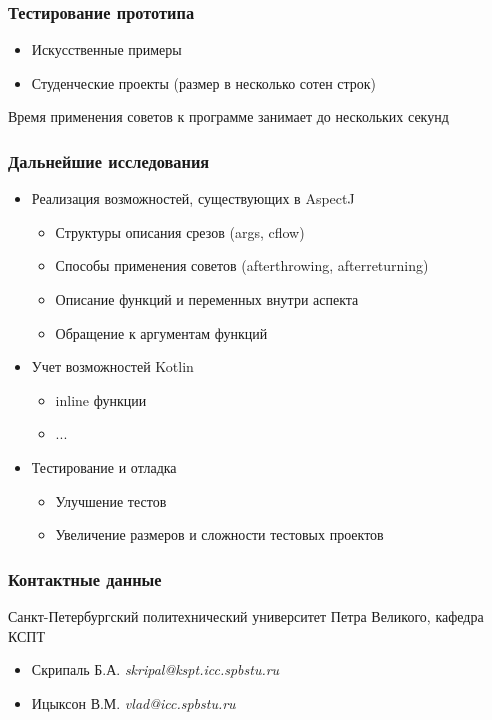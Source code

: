 \documentclass[hyperref={pdftex,unicode}]{beamer}
\begin{document}
\begin{frame}[fragile=singleslide]
	\frametitle{Тестирование прототипа}
	\begin{itemize}
		\item Искусственные примеры
		\item Студенческие проекты (размер в несколько сотен строк)
	\end{itemize}
	
	Время применения советов к программе занимает до нескольких секунд
\end{frame}

\begin{frame}[fragile=singleslide]
	\frametitle{Дальнейшие исследования}
	\begin{itemize}
		\item Реализация возможностей, существующих в AspectJ
			\begin{itemize}
				\item Структуры описания срезов (args, cflow)
				\item Способы применения советов (afterthrowing, afterreturning)
				\item Описание функций и переменных внутри аспекта
				\item Обращение к аргументам функций
			\end{itemize}
		\item Учет возможностей Kotlin
			\begin{itemize}
				\item inline функции
				\item ...
			\end{itemize}
		\item Тестирование и отладка
			\begin{itemize}
				\item Улучшение тестов
				\item Увеличение размеров и сложности тестовых проектов
			\end{itemize}
	\end{itemize}
\end{frame}

\begin{frame}[fragile=singleslide]
	\frametitle{Контактные данные}
	\begin{center}
	{\Large Санкт-Петербургский политехнический университет Петра Великого, кафедра КСПТ}
	\newline
	\begin{itemize}
		\item Скрипаль Б.А. \textit{skripal@kspt.icc.spbstu.ru}
		\item Ицыксон В.М. \textit{vlad@icc.spbstu.ru}
	\end{itemize}
	\end{center}
\end{frame}
\end{document}

